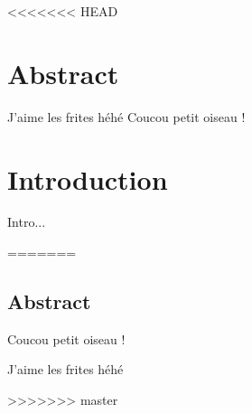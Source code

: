 <<<<<<< HEAD

\section{Abstract}

J'aime les frites héhé
Coucou petit oiseau !
\section{Introduction}
Intro...


=======
\begin{Document}
\section{Abstract}
Coucou petit oiseau !

J'aime les frites héhé

\end{Document}
>>>>>>> master
